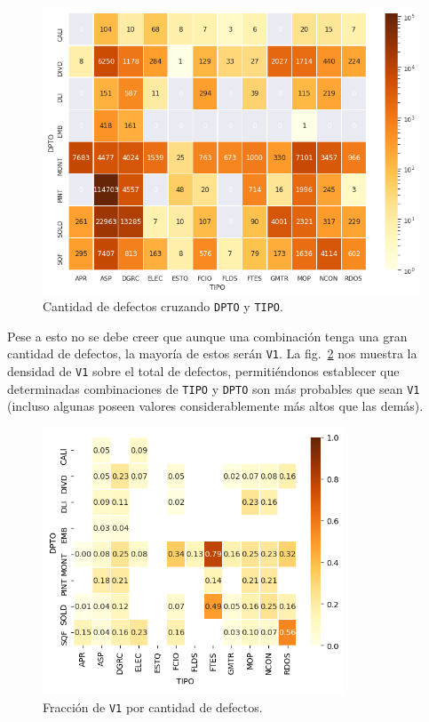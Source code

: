 \documentclass[a4paper,12pt]{article}
\begin{document}
		\begin{figure}[H]
			\begin{center}
				\includegraphics[width=1\textwidth]{tesis_56.png}
				\caption{Cantidad de defectos cruzando \texttt{DPTO} y \texttt{TIPO}.}
				\label{fig:heatmapdptotype}
			\end{center}
		\end{figure}
				
		\clearpage
				
		Pese a esto no se debe creer que aunque una combinación tenga una gran cantidad de defectos, la mayoría de estos serán \texttt{V1}. La fig.~\ref{fig:heatmapfractionv1} nos muestra la densidad de \texttt{V1} sobre el total de defectos, permitiéndonos establecer que determinadas combinaciones de \texttt{TIPO} y \texttt{DPTO} son más probables que sean \texttt{V1} (incluso algunas poseen valores considerablemente más altos que las demás).
				
		\begin{figure}[H]
			\begin{center}
				\includegraphics[width=0.8\textwidth]{tesis_58.png}
				\caption{Fracción de \texttt{V1} por cantidad de defectos.}
				\label{fig:heatmapfractionv1}
			\end{center}
		\end{figure}
				
\end{document}

